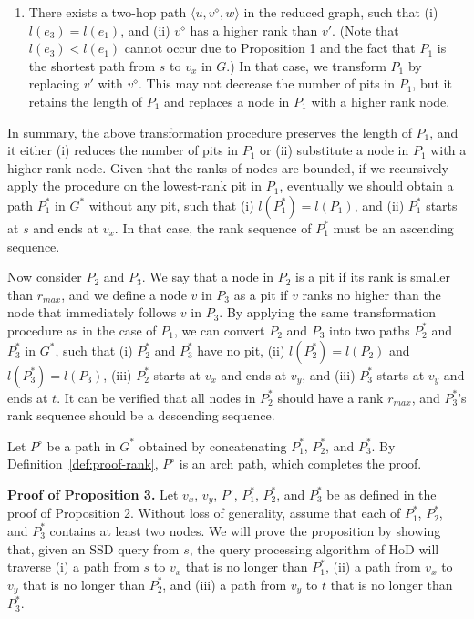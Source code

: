 \documentclass{sig-alternate}
\def\header{\vspace{2mm} \noindent}
\def\G{G^*}
\def\PA{P^\circ}
\begin{document}
\begin{sloppy}
\begin{enumerate}
\item There exists a two-hop path $\langle u, v^\diamond, w\rangle$ in the reduced graph, such that (i) $l(e_3) = l(e_1)$, and (ii) $v^\diamond$ has a higher rank than $v'$. (Note that $l(e_3) < l(e_1)$ cannot occur due to Proposition 1 and the fact that $P_1$ is the shortest path from $s$ to $v_x$ in $G$.) In that case, we transform $P_1$ by replacing $v'$ with $v^\diamond$. This may not decrease the number of pits in $P_1$, but it retains the length of $P_1$ and replaces a node in $P_1$ with a higher rank node. 
\end{enumerate}
In summary, the above transformation procedure preserves the length of $P_1$, and it either (i) reduces the number of pits in $P_1$ or (ii) substitute a node in $P_1$ with a higher-rank node. Given that the ranks of nodes are bounded, if we recursively apply the procedure on the lowest-rank pit in $P_1$, eventually we should obtain a path $P_1^*$ in $\G$ without any pit, such that (i) $l(P_1^*) = l(P_1)$, and (ii) $P_1^*$ starts at $s$ and ends at $v_x$. In that case, the rank sequence of $P_1^*$ must be an ascending sequence.

Now consider $P_2$ and $P_3$. We say that a node in $P_2$ is a pit if its rank is smaller than $r_{max}$, and we define a node $v$ in $P_3$ as a pit if $v$ ranks no higher than the node that immediately follows $v$ in $P_3$. By applying the same transformation procedure as in the case of $P_1$, we can convert $P_2$ and $P_3$ into two paths $P_2^*$ and $P_3^*$ in $\G$, such that (i) $P_2^*$ and $P_3^*$ have no pit, (ii) $l(P_2^*) = l(P_2)$ and $l(P_3^*) = l(P_3)$, (iii) $P_2^*$ starts at $v_x$ and ends at $v_y$, and (iii) $P_3^*$ starts at $v_y$ and ends at $t$. It can be verified that all nodes in $P_2^*$ should have a rank $r_{max}$, and $P_3^*$'s rank sequence should be a descending sequence.

Let $\PA$ be a path in $\G$ obtained by concatenating $P_1^*$, $P_2^*$, and $P_3^*$. By Definition~\ref{def:proof-rank}, $\PA$ is an arch path, which completes the proof.


\header
{\bf Proof of Proposition 3.} Let $v_x$, $v_y$, $\PA$, $P_1^*$, $P_2^*$, and $P_3^*$ be as defined in the proof of Proposition 2. Without loss of generality, assume that each of $P_1^*$, $P_2^*$, and $P_3^*$ contains at least two nodes. We will prove the proposition by showing that, given an SSD query from $s$, the query processing algorithm of HoD will traverse (i) a path from $s$ to $v_x$ that is no longer than $P_1^*$, (ii) a path from $v_x$ to $v_y$ that is no longer than $P_2^*$, and (iii) a path from $v_y$ to $t$ that is no longer than $P_3^*$.


\end{sloppy}
\end{document}
